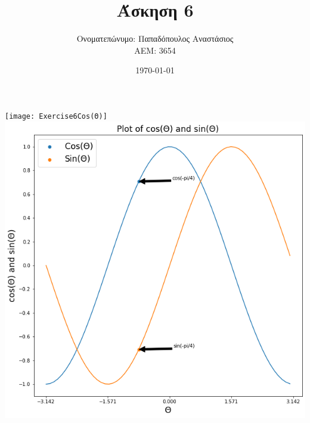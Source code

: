 \documentclass{article}
\title{Άσκηση 6}
\author{Ονοματεπώνυμο: Παπαδόπουλος Αναστάσιος \\ 
        ΑΕΜ: 3654}
\date{\today}
\begin{document}
    \maketitle
    \begin{center}
        \texttt{[image: Exercise6Cos(Θ)]}
        \includegraphics[scale=0.30]{Exercise6Cos(Θ)Sin(Θ)}
    \end{center}
\end{document}
